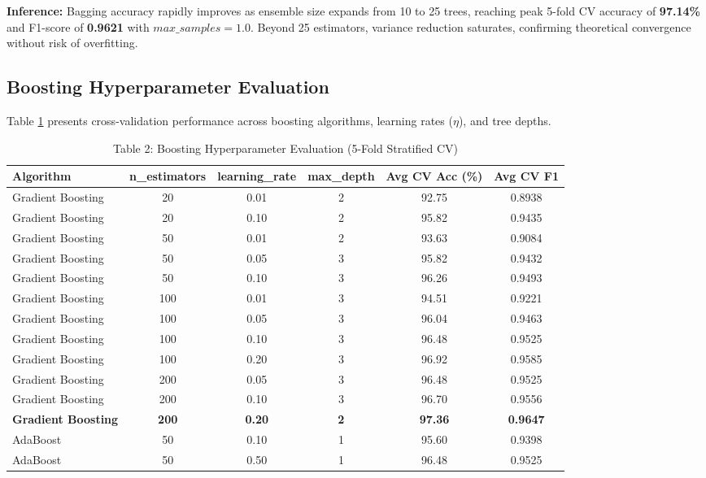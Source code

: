 \documentclass[12pt,a4paper]{article}
\begin{document}
\textbf{Inference:} Bagging accuracy rapidly improves as ensemble size expands from 10 to 25 trees, reaching peak 5-fold CV accuracy of \textbf{97.14\%} and F1-score of \textbf{0.9621} with $max\_samples = 1.0$. Beyond 25 estimators, variance reduction saturates, confirming theoretical convergence without risk of overfitting.

\subsection{Boosting Hyperparameter Evaluation}
Table \ref{tab:boosting_results} presents cross-validation performance across boosting algorithms, learning rates ($\eta$), and tree depths.

\begin{table}[H]
\centering
\caption{Table 2: Boosting Hyperparameter Evaluation (5-Fold Stratified CV)}
\label{tab:boosting_results}
\begin{tabular}{|l|c|c|c|c|c|}
\hline
\textbf{Algorithm} & \textbf{n\_estimators} & \textbf{learning\_rate} & \textbf{max\_depth} & \textbf{Avg CV Acc (\%)} & \textbf{Avg CV F1} \\ \hline
Gradient Boosting & 20 & 0.01 & 2 & 92.75 & 0.8938 \\ \hline
Gradient Boosting & 20 & 0.10 & 2 & 95.82 & 0.9435 \\ \hline
Gradient Boosting & 50 & 0.01 & 2 & 93.63 & 0.9084 \\ \hline
Gradient Boosting & 50 & 0.05 & 3 & 95.82 & 0.9432 \\ \hline
Gradient Boosting & 50 & 0.10 & 3 & 96.26 & 0.9493 \\ \hline
Gradient Boosting & 100 & 0.01 & 3 & 94.51 & 0.9221 \\ \hline
Gradient Boosting & 100 & 0.05 & 3 & 96.04 & 0.9463 \\ \hline
Gradient Boosting & 100 & 0.10 & 3 & 96.48 & 0.9525 \\ \hline
Gradient Boosting & 100 & 0.20 & 3 & 96.92 & 0.9585 \\ \hline
Gradient Boosting & 200 & 0.05 & 3 & 96.48 & 0.9525 \\ \hline
Gradient Boosting & 200 & 0.10 & 3 & 96.70 & 0.9556 \\ \hline
\textbf{Gradient Boosting} & \textbf{200} & \textbf{0.20} & \textbf{2} & \textbf{97.36} & \textbf{0.9647} \\ \hline
AdaBoost & 50 & 0.10 & 1 & 95.60 & 0.9398 \\ \hline
AdaBoost & 50 & 0.50 & 1 & 96.48 & 0.9525 \\ \hline

\end{tabular}
\end{table}
\end{document}
